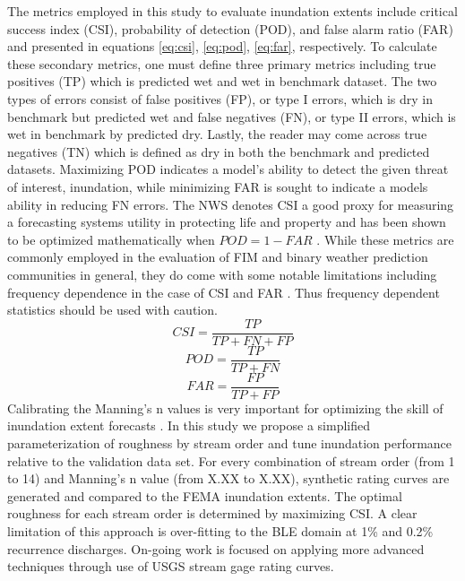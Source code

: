The metrics employed in this study to evaluate inundation extents include critical success index (CSI), probability of detection (POD), and false alarm ratio (FAR) and presented in equations \ref{eq:csi}, \ref{eq:pod}, \ref{eq:far}, respectively.
To calculate these secondary metrics, one must define three primary metrics including true positives (TP) which is predicted wet and wet in benchmark dataset.
The two types of errors consist of false positives (FP), or type I errors, which is dry in benchmark but predicted wet and false negatives (FN), or type II errors, which is wet in benchmark by predicted dry. 
Lastly, the reader may come across true negatives (TN) which is defined as dry in both the benchmark and predicted datasets.
Maximizing POD indicates a model's ability to detect the given threat of interest, inundation, while minimizing FAR is sought to indicate a models ability in reducing FN errors.
The NWS denotes CSI a good proxy for measuring a forecasting systems utility in protecting life and property and has been shown to be optimized mathematically when $POD = 1 - FAR$ \cite{gerapetritis2004behavior}.
While these metrics are commonly employed in the evaluation of FIM and binary weather prediction communities in general, they do come with some notable limitations including frequency dependence in the case of CSI and FAR \cite{gerapetritis2004behavior,stephens2014problems,schaefer1990critical,jolliffe2012forecast}.
Thus frequency dependent statistics should be used with caution. 
%
\begin{equation}
\label{eq:csi}
CSI = \frac{TP}{TP + FN + FP}
\end{equation}
%
\begin{equation}
\label{eq:pod}
POD = \frac{TP}{TP + FN}
\end{equation}
%
\begin{equation}
\label{eq:far}
FAR = \frac{FP}{TP + FP}
\end{equation}
%
Calibrating the Manning's n values is very important for optimizing the skill of inundation extent forecasts \cite{zheng2018river,garousi2019terrain}.
 In this study we propose a simplified parameterization of roughness by stream order and tune inundation performance relative to the validation data set.
For every combination of stream order (from 1 to 14) and Manning's n value (from X.XX to X.XX), synthetic rating curves are generated and compared to the FEMA inundation extents.
The optimal roughness for each stream order is determined by maximizing CSI.
A clear limitation of this approach is over-fitting to the BLE domain at 1\% and 0.2\% recurrence discharges.
On-going work is focused on applying more advanced techniques through use of USGS stream gage rating curves.
%
